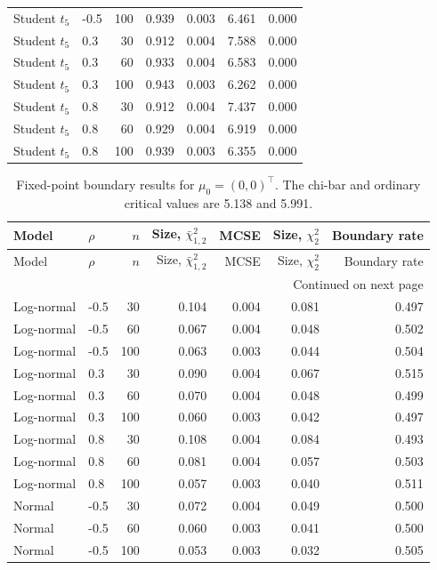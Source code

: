 \documentclass[11pt]{article}
\theoremstyle{remark}
\begin{document}
\begin{longtable}{llrrrrr}
Student $t_5$ & -0.5 & 100 & 0.939 & 0.003 & 6.461 & 0.000 \\
Student $t_5$ & 0.3 & 30 & 0.912 & 0.004 & 7.588 & 0.000 \\
Student $t_5$ & 0.3 & 60 & 0.933 & 0.004 & 6.583 & 0.000 \\
Student $t_5$ & 0.3 & 100 & 0.943 & 0.003 & 6.262 & 0.000 \\
Student $t_5$ & 0.8 & 30 & 0.912 & 0.004 & 7.437 & 0.000 \\
Student $t_5$ & 0.8 & 60 & 0.929 & 0.004 & 6.919 & 0.000 \\
Student $t_5$ & 0.8 & 100 & 0.939 & 0.003 & 6.355 & 0.000 \\
\end{longtable}

\begin{longtable}{llrrrrr}
\caption{Fixed-point boundary results for $\mu_0=(0,0)^\top$. The chi-bar and ordinary critical values are 5.138 and 5.991.}\label{tab:boundary-full}\\
\toprule
Model & $\rho$ & $n$ & Size, $\bar\chi^2_{1,2}$ & MCSE & Size, $\chi^2_2$ & Boundary rate \\
\midrule
\endfirsthead
\toprule
Model & $\rho$ & $n$ & Size, $\bar\chi^2_{1,2}$ & MCSE & Size, $\chi^2_2$ & Boundary rate \\
\midrule
\endhead
\midrule
\multicolumn{7}{r}{Continued on next page}\\
\endfoot
\bottomrule
\endlastfoot
Log-normal & -0.5 & 30 & 0.104 & 0.004 & 0.081 & 0.497 \\
Log-normal & -0.5 & 60 & 0.067 & 0.004 & 0.048 & 0.502 \\
Log-normal & -0.5 & 100 & 0.063 & 0.003 & 0.044 & 0.504 \\
Log-normal & 0.3 & 30 & 0.090 & 0.004 & 0.067 & 0.515 \\
Log-normal & 0.3 & 60 & 0.070 & 0.004 & 0.048 & 0.499 \\
Log-normal & 0.3 & 100 & 0.060 & 0.003 & 0.042 & 0.497 \\
Log-normal & 0.8 & 30 & 0.108 & 0.004 & 0.084 & 0.493 \\
Log-normal & 0.8 & 60 & 0.081 & 0.004 & 0.057 & 0.503 \\
Log-normal & 0.8 & 100 & 0.057 & 0.003 & 0.040 & 0.511 \\
Normal & -0.5 & 30 & 0.072 & 0.004 & 0.049 & 0.500 \\
Normal & -0.5 & 60 & 0.060 & 0.003 & 0.041 & 0.500 \\
Normal & -0.5 & 100 & 0.053 & 0.003 & 0.032 & 0.505 \\

\end{longtable}
\end{document}
